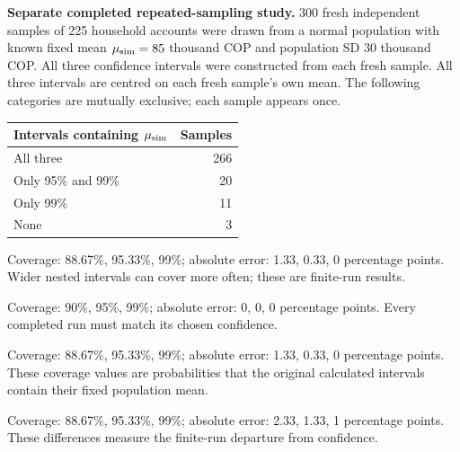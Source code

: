 \textbf{Separate completed repeated-sampling study.} 300 fresh independent samples of 225 household accounts were drawn from a normal population with known fixed mean $\mu_{\rm sim}=85$ thousand COP and population SD 30 thousand COP. All three confidence intervals were constructed from each fresh sample.
All three intervals are centred on each fresh sample's own mean. The following categories are mutually exclusive; each sample appears once.
\begin{center}\begin{tabular}{@{}lr@{}}\toprule
Intervals containing $\mu_{\rm sim}$ & Samples\\\midrule
All three & 266 \\[6pt]
Only 95\% and 99\% & 20 \\[6pt]
Only 99\% & 11 \\[6pt]
None & 3 \\[6pt]
\bottomrule\end{tabular}\end{center}

\begin{answeroptions}
\item Coverage: 88.67\%, 95.33\%, 99\%; absolute error: 1.33, 0.33, 0 percentage points. Wider nested intervals can cover more often; these are finite-run results.
\item Coverage: 90\%, 95\%, 99\%; absolute error: 0, 0, 0 percentage points. Every completed run must match its chosen confidence.
\item Coverage: 88.67\%, 95.33\%, 99\%; absolute error: 1.33, 0.33, 0 percentage points. These coverage values are probabilities that the original calculated intervals contain their fixed population mean.
\item Coverage: 88.67\%, 95.33\%, 99\%; absolute error: 2.33, 1.33, 1 percentage points. These differences measure the finite-run departure from confidence.
\end{answeroptions}
\clearpage
